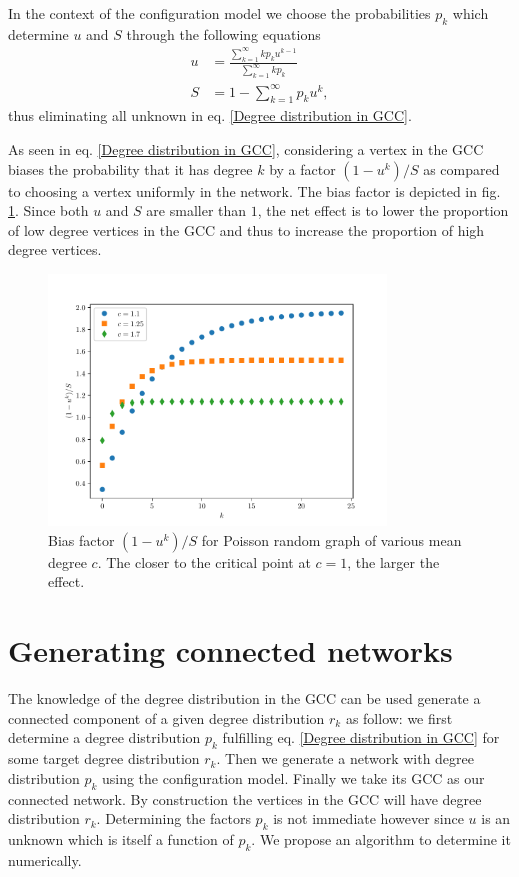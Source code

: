 \documentclass[a4paper]{article}
\begin{document}
In the context of the configuration model we choose the probabilities $p_k$ which determine $u$ and $S$ through the following equations \cite{newman2010networks}
\begin{align}
	u &= \frac{\sum_{k=1}^\infty k p_k u^{k-1}}{\sum_{k=1}^\infty k p_k} \\ \label{Expression for u}
	S &= 1 - \sum_{k=1}^\infty p_k u^{k},
\end{align}
thus eliminating all unknown in eq. \eqref{Degree distribution in GCC}.

As seen in eq. \eqref{Degree distribution in GCC}, considering a vertex in the GCC biases the probability that it has degree $k$ by a factor $(1 - u^k)/S$ as compared to choosing a vertex uniformly in the network. The bias factor is depicted in fig. \ref{Figure: low degree saturation}. Since both $u$ and $S$ are smaller than $1$, the net effect is to lower the proportion of low degree vertices in the GCC and thus to increase the proportion of high degree vertices.

\begin{figure}
	\includegraphics[width=0.8\textwidth]{drift_term.pdf}
	\caption{Bias factor $(1 - u^k)/S$ for Poisson random graph of various mean degree $c$. The closer to the critical point at $c = 1$, the larger the effect.}
	\label{Figure: low degree saturation}
\end{figure}

\section{Generating connected networks}

The knowledge of the degree distribution in the GCC can be used generate a connected component of a given degree distribution $r_k$ as follow: we first determine a degree distribution $p_k$ fulfilling eq. \eqref{Degree distribution in GCC} for some target degree distribution $r_k$. Then we generate a network with degree distribution $p_k$ using the configuration model. Finally we take its GCC as our connected network. By construction the vertices in the GCC will have degree distribution $r_k$. Determining the factors $p_k$ is not immediate however since $u$ is an unknown which is itself a function of $p_k$. We propose an algorithm to determine it numerically.
\end{document}
